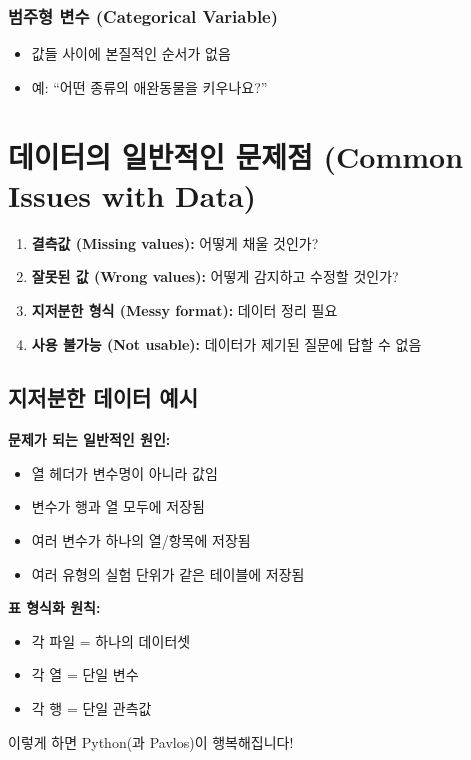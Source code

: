 \documentclass[12pt,a4paper]{article}
\begin{document}
\subsubsection{범주형 변수 (Categorical Variable)}
\begin{itemize}
    \item 값들 사이에 본질적인 순서가 없음
    \item 예: ``어떤 종류의 애완동물을 키우나요?''
\end{itemize}

\section{데이터의 일반적인 문제점 (Common Issues with Data)}

\begin{enumerate}
    \item \textbf{결측값 (Missing values):} 어떻게 채울 것인가?
    \item \textbf{잘못된 값 (Wrong values):} 어떻게 감지하고 수정할 것인가?
    \item \textbf{지저분한 형식 (Messy format):} 데이터 정리 필요
    \item \textbf{사용 불가능 (Not usable):} 데이터가 제기된 질문에 답할 수 없음
\end{enumerate}

\subsection{지저분한 데이터 예시}

\textbf{문제가 되는 일반적인 원인:}
\begin{itemize}
    \item 열 헤더가 변수명이 아니라 값임
    \item 변수가 행과 열 모두에 저장됨
    \item 여러 변수가 하나의 열/항목에 저장됨
    \item 여러 유형의 실험 단위가 같은 테이블에 저장됨
\end{itemize}

\textbf{표 형식화 원칙:}
\begin{itemize}
    \item 각 파일 = 하나의 데이터셋
    \item 각 열 = 단일 변수
    \item 각 행 = 단일 관측값
\end{itemize}

이렇게 하면 Python(과 Pavlos)이 행복해집니다!
\end{document}
